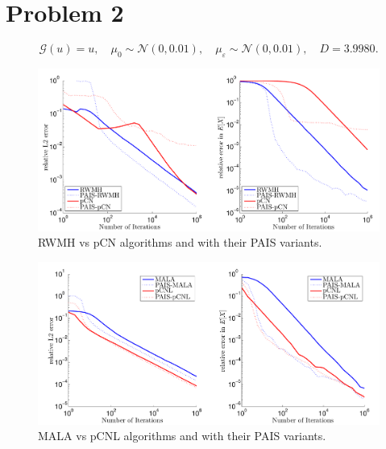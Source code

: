 \documentclass{article}
\begin{document}
\section{Problem 2}
\[
	\mathcal{G}(u) = u, \quad \mu_0 \sim \mathcal{N}(0, 0.01), \quad \mu_\varepsilon \sim \mathcal{N}(0, 0.01), \quad D = 3.9980.
\]
\begin{figure}[h]
\begin{center}
\includegraphics[width=\textwidth]{figures/RWMH2-pCN2}
\end{center}
\caption{RWMH vs pCN algorithms and with their PAIS variants.}
\label{fig:RWMH1}
\end{figure}
\begin{figure}[h]
\begin{center}
\includegraphics[width=\textwidth]{figures/MALA2-pCNL2}
\end{center}
\caption{MALA vs pCNL algorithms and with their PAIS variants.}
\label{fig:MALA1}
\end{figure}

\FloatBarrier\newpage
\end{document}
